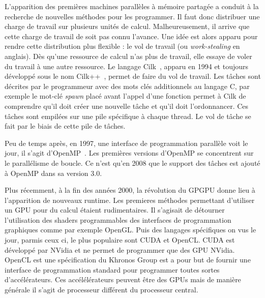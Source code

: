 L'apparition des premières machines parallèles à mémoire partagée a conduit à la recherche de nouvelles méthodes pour les programmer.
%
Il faut donc distribuer une charge de travail sur plusieurs unités de calcul.
%
Malheureusement, il arrive que cette charge de travail de soit pas connu l'avance.
%
Une idée est alors apparu pour rendre cette distribution plus flexible : le vol de travail (ou {\em work-stealing} en anglais).
%
Dès qu'une ressource de calcul n'as plus de travail, elle essaye de voler du travail à une autre ressource.
%
Le langage Cilk~\cite{Cilk}, apparu en 1994 et toujours développé sous le nom Cilk++~\cite{Cilk++}, permet de faire du vol de travail.
%
Les tâches sont décrites par le programmeur avec des mots clés additionnels au langage C, par exemple le mot-clé {\em spawn} placé avant l'appel d'une fonction permet à Cilk de comprendre qu'il doit créer une nouvelle tâche et qu'il doit l'ordonnancer.
%
Ces tâches sont empilées sur une pile spécifique à chaque thread.
%
Le vol de tâche se fait par le biais de cette pile de tâches.


Peu de temps après, en 1997, une interface de programmation parallèle voit le jour, il s'agit d'OpenMP~\cite{OpenMP}.
%
Les premières versions d'OpenMP se concentrent sur le parallélisme de boucle.
%
Ce n'est qu'en 2008 que le support des tâches est ajouté à OpenMP dans sa version 3.0.



Plus récemment, à la fin des années 2000, la révolution du GPGPU donne lieu à l'apparition de nouveaux runtime.
%
Les premieres méthodes permettant d'utiliser un GPU pour du calcul étaient rudimentaires.
%
Il s'agisait de détourner l'utilisation des shaders programmables des interfaces de programmation graphiques comme par exemple OpenGL.
%
Puis des langages spécifiques on vus le jour, parmis ceux ci, le plus populaire sont CUDA et OpenCL.
%
CUDA est développé par NVidia et ne permet de programmer que des GPU NVidia.
%
OpenCL est une spécification du Khronos Group est a pour but de fournir une interface de programmation standard pour programmer toutes sortes d'accélérateurs.
%
Ces accélélérateurs peuvent être des GPUs mais de manière générale il s'agit de processeur différent du processeur central.





